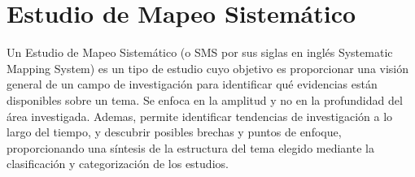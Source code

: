 \section{Estudio de Mapeo Sistemático}

Un Estudio de Mapeo Sistemático (o SMS por sus siglas en inglés Systematic Mapping System) es un tipo de estudio cuyo objetivo es proporcionar una visión general de un campo de investigación para identificar qué evidencias están disponibles sobre un tema. \cite{definicion_sms} Se enfoca en la amplitud y no en la profundidad del área investigada. Ademas, permite identificar tendencias de investigación a lo largo del tiempo, y descubrir posibles brechas y puntos de enfoque, proporcionando una síntesis de la estructura del tema elegido mediante la clasificación y categorización de los estudios.